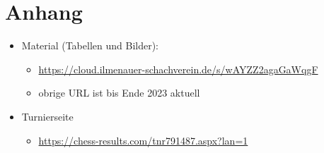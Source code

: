 \documentclass[a4paper,german]{tui-algo-seminar}
\begin{document}
\section{Anhang}

\begin{itemize}
    \item Material (Tabellen und Bilder): 
    \begin{itemize}
        \item \url{https://cloud.ilmenauer-schachverein.de/s/wAYZZ2agaGaWqgF}
        \item obrige URL ist bis Ende 2023 aktuell 
    \end{itemize}
        \item Turnierseite
        \begin{itemize}
            \item \url{https://chess-results.com/tnr791487.aspx?lan=1}
        \end{itemize}
    \end{itemize}
\end{document}
